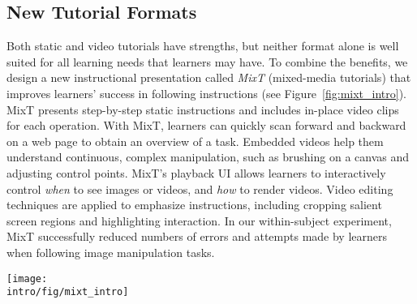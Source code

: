

\subsection{New Tutorial Formats}

Both static and video tutorials have strengths, but neither format alone is well suited for all learning needs that learners may have.
%
To combine the benefits, we design a new instructional presentation called \emph{MixT} (mixed-media tutorials) that improves learners' success in following instructions (see Figure~\ref{fig:mixt_intro}).
%
MixT presents step-by-step static instructions and includes in-place video clips for each operation.
%
With MixT, learners can quickly scan forward and backward on a web page to obtain an overview of a task. Embedded videos help them understand continuous, complex manipulation, such as brushing on a canvas and adjusting control points.
%
MixT's playback UI allows learners to interactively control \emph{when} to see images or videos, and \emph{how} to render videos.
%
Video editing techniques are applied to emphasize instructions, including cropping salient screen regions and highlighting interaction.
%
In our within-subject experiment, MixT successfully reduced numbers of errors and attempts made by learners when following image manipulation tasks.

\begin{figure*}[t]
  \centering
  \texttt{[image: \\intro/fig/mixt\_intro]}
  \caption{MixT generates step-by-step tutorials (left) that contain static and video information from task demonstrations. Videos are automatically edited and offer different views (right) to highlight the most relevant screen areas for a step. Visualizing mouse movement helps learners understand a complex action.}
  \label{fig:mixt_intro}
\end{figure*}

